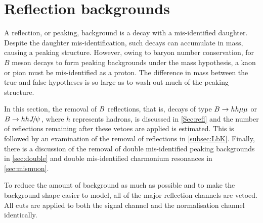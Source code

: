 \section{Reflection backgrounds}
\label{Sec:backgrounds}
A reflection, or peaking, background is a decay with a mis-identified daughter. Despite the daughter mis-identification, such decays can accumulate in mass, causing a peaking structure. However, owing to baryon number conservation, for $B$ meson decays to form peaking backgrounds under the \Lbpi mass hypothesis, a kaon or pion must be mis-identified as a proton. The difference in mass between the true and false hypotheses is so large as to wash-out much of the peaking structure.



In this section, the removal of ${B}$ reflections, that is, decays of type ${B}\rightarrow hh\mu\mu$ or ${B}\rightarrow hh{{J\mkern -3mu/\mkern -2mu\psi\mkern 2mu}}$, where $h$ represents hadrons, is discussed in \autoref{Sec:refl} and the number of reflections remaining after these vetoes are applied is estimated. This is followed by an examination of the removal of \LbK reflections in \autoref{subsec:LbK}. Finally, there is a discussion of the removal of double mis-identified peaking backgrounds in \autoref{sec:double} and double mis-identified charmonium resonances in \autoref{sec:mismuon}.

To reduce the amount of background as much as possible and to make the background shape easier to model, all of the major reflection channels are vetoed. All cuts are applied to both the signal channel \Lbpi and the normalisation channel \Lbpijpsi identically.


